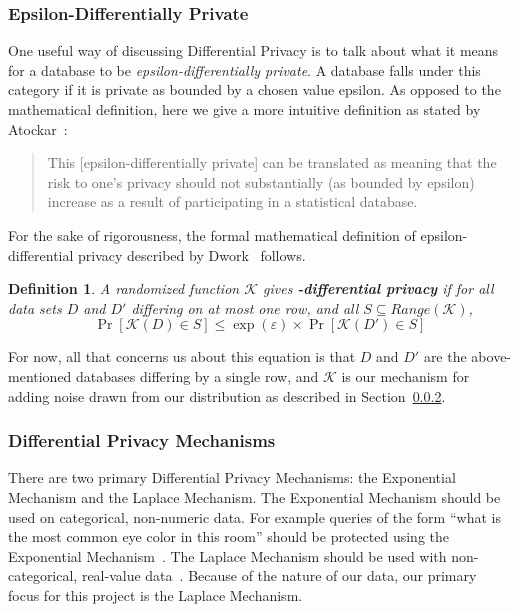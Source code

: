 \documentclass[conference,11pt]{IEEEtran}
\newtheorem{definition}{Definition}
\begin{document}
\subsubsection{Epsilon-Differentially Private}\label{sec:epsilon-dp}
One useful way of discussing Differential Privacy is to talk about what it means
for a database to be \textit{epsilon-differentially private}. A database falls
under this category if it is private as bounded by a chosen value epsilon. As
opposed to the mathematical definition, here we give a more intuitive definition
as stated by Atockar~\cite{Atockar:2014}:

\blockquote{%
    This [epsilon-differentially private] can be translated as meaning that the
    risk to one's privacy should not substantially (as bounded by epsilon)
    increase as a result of participating in a statistical database.
}

For the sake of rigorousness, the formal mathematical definition of
epsilon-differential privacy described by Dwork~\cite{Dwork:2006:DP} follows.

\begin{mdframed}
    \begin{definition}
        A randomized function $\mathcal{K}$ gives
        \textbf{\textepsilon-differential privacy} if for all data sets $D$ and
        $D'$ differing on at most one row, and all $S \subseteq
        Range(\mathcal{K})$,
        \begin{equation}
            \Pr[\mathcal{K}(D) \in S] \leq \exp(\varepsilon) \times
            \Pr[\mathcal{K}(D') \in S]
        \end{equation}
    \end{definition}
\end{mdframed}

For now, all that concerns us about this equation is that $D$ and $D'$ are the
above-mentioned databases differing by a single row, and $\mathcal{K}$ is our
mechanism for adding noise drawn from our distribution as described in
Section~\ref{sec:dp-mech}.

\subsubsection{Differential Privacy Mechanisms}\label{sec:dp-mech}
There are two primary Differential Privacy Mechanisms: the Exponential Mechanism
and the Laplace Mechanism. The Exponential Mechanism should be used on
categorical, non-numeric data. For example queries of the form ``what is the
most common eye color in this room'' should be protected using the Exponential
Mechanism~\cites{Atockar:2014}[8]{Roth:2011:DP-exp}. The Laplace Mechanism should be used with
non-categorical, real-value data~\cite{Geng:2014}. Because of the nature of our
data, our primary focus for this project is the Laplace Mechanism.
\end{document}
